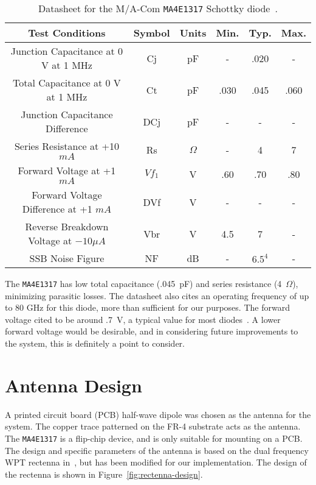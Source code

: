 \def\arraystretch{2}
\begin{table}[h!]
\centering
\begin{tabular}{|c|c|c|c|c|c|}
\hline
\textbf{Test Conditions} & \textbf{Symbol} & \textbf{Units} & \textbf{Min.} & \textbf{Typ.} & \textbf{Max.} \\ \hline
Junction Capacitance at 0 V at 1 MHz & Cj & pF & - & .020 & - \\ \hline
Total Capacitance at 0 V at 1 MHz & Ct & pF & .030 & .045 & .060 \\ \hline
Junction Capacitance Difference & DCj & pF & - & - & - \\ \hline
Series Resistance at +10 $mA$ & Rs & $\Omega$ & - & 4 & 7 \\ \hline
Forward Voltage at +1 $mA$ & $Vf_1$ & V & .60 & .70 & .80 \\ \hline
Forward Voltage Difference at +1 $mA$ & DVf & V & - & - & - \\ \hline
Reverse Breakdown Voltage at $-10 \mu A$ & Vbr & V & 4.5 & 7 & - \\ \hline
SSB Noise Figure & NF & dB & - & $6.5^4$ & - \\ \hline
\end{tabular}
\caption[Datasheet for diode used in rectenna construction]{Datasheet for the M/A-Com \texttt{MA4E1317} Schottky diode~\cite{ma4e1317-datasheet}.}
\label{tab:rectenna-datasheet}
\end{table}

The \texttt{MA4E1317} has low total capacitance (.045~pF) and series resistance (4~$\Omega$), minimizing parasitic losses. The datasheet also cites an operating frequency of up to 80 GHz for this diode, more than sufficient for our purposes. The forward voltage cited to be around .7~V, a typical value for most diodes~\cite{ma4e1317-datasheet}. A lower forward voltage would be desirable, and in considering future improvements to the system, this is definitely a point to consider.

\section{Antenna Design}
\label{sec:rectenna-antenna}

A printed circuit board (PCB) half-wave dipole was chosen as the antenna for the system. The copper trace patterned on the FR-4 substrate acts as the antenna. The \texttt{MA4E1317} is a flip-chip device, and is only suitable for mounting on a PCB. The design and specific parameters of the antenna is based on the dual frequency WPT rectenna in~\cite{suh2002high}, but has been modified for our implementation. The design of the rectenna is shown in Figure~\ref{fig:rectenna-design}.


